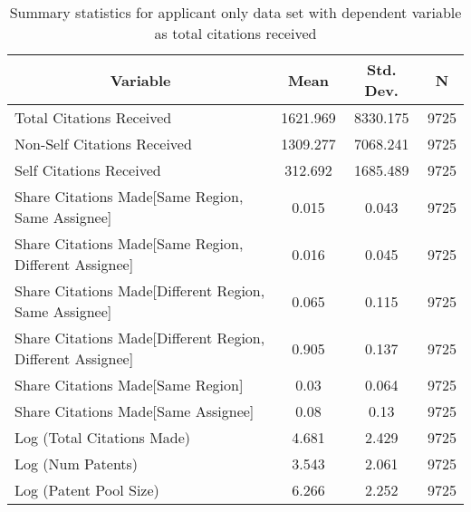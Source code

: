 
\begin{table}[htbp]\centering \caption{Summary statistics for applicant only data set with dependent variable as total citations received  \label{a.tsummary}}
\begin{tabular}{l c c  c}\hline\hline
\multicolumn{1}{c}{\textbf{Variable}} & \textbf{Mean}
 & \textbf{Std. Dev.} & \textbf{N}\\ \hline
Total Citations Received & 1621.969 & 8330.175  & 9725\\
Non-Self Citations Received & 1309.277 & 7068.241  & 9725\\
Self Citations Received & 312.692 & 1685.489  & 9725\\
Share Citations Made[Same Region, Same Assignee] & 0.015 & 0.043  & 9725\\
Share Citations Made[Same Region, Different Assignee] & 0.016 & 0.045  & 9725\\
Share Citations Made[Different Region, Same Assignee] & 0.065 & 0.115  & 9725\\
Share Citations Made[Different Region, Different Assignee] & 0.905 & 0.137  & 9725\\
Share Citations Made[Same Region] & 0.03 & 0.064  & 9725\\
Share Citations Made[Same Assignee] & 0.08 & 0.13  & 9725\\
Log (Total Citations Made) & 4.681 & 2.429  & 9725\\
Log (Num Patents) & 3.543 & 2.061  & 9725\\
Log (Patent Pool Size) & 6.266 & 2.252  & 9725\\
\hline\end{tabular}
\end{table}
